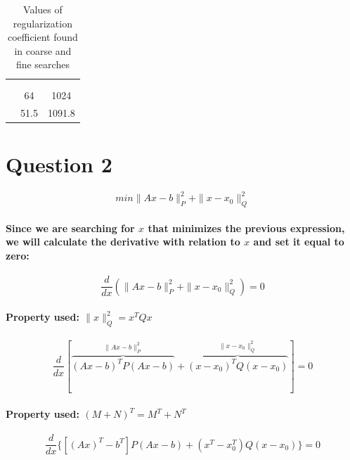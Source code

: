 \documentclass[a4paper]{article}    %
\begin{document}
\begin{table}[H]
    \begin{center}
        \begin{tabular}{r|c|c|} 
            \cline{2-3}
            & \multicolumn{2}{|c|}{\cellcolor[gray]{0.8}{$\lambda$ optimum}} \\
            \cline{2-3}
            & \cellcolor[gray]{0.8}{MSE} & \cellcolor[gray]{0.8}{Accuracy} \\
            \cline{1-3}
            \multicolumn{1}{|r|}{\cellcolor[gray]{0.8}{coarse search}} & 64   & 1024   \\
            \cline{1-3}
            \multicolumn{1}{|r|}{\cellcolor[gray]{0.8}{fine search}}   & 51.5 & 1091.8 \\
            \cline{1-3}
        \end{tabular}
    \end{center}
    \caption{Values of regularization coefficient found in coarse and fine searches}
    \label{tab:alpha_results}
\end{table}

\newpage

\section*{Question 2}

\[min\|Ax-b\|_{P}^{2}+\|x-x_{0}\|_{Q}^{2}\]
\paragraph{Since we are searching for $x$ that minimizes the previous expression, we will calculate the derivative with relation to $x$ and set it equal to zero:}
    \[\frac{d}{dx} (\|Ax-b\|_{P}^{2}+\|x-x_{0}\|_{Q}^{2}) = 0\]
\paragraph{Property used: $\|x\|_{Q}^{2} = x^{T}Qx$}
    \[\frac{d}{dx} [\overbrace{(Ax-b)^{T} P (Ax-b)}^{\|Ax-b\|_{P}^{2}} + \overbrace{(x-x_0)^T Q (x-x_0)}^{\|x-x_{0}\|_{Q}^{2}}] = 0\]
\paragraph{Property used: $(M + N)^T = M^T + N^T$}
    \[\frac{d}{dx} \{[(Ax)^T-b^T] P (Ax-b) + (x^T-x_0^T) Q (x-x_0)\} = 0\]
\end{document}

